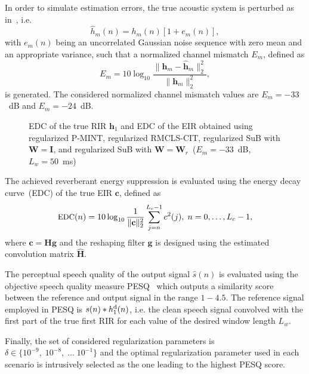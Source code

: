 \documentclass{article}
\begin{document}
In order to simulate estimation errors, the true acoustic system is perturbed as in~\cite{Cho_ITSA_1999}, i.e.
\begin{equation}
\hat{h}_m(n) = h_m(n)[1 + e_m(n)],
\end{equation}
with $e_m(n)$ being an uncorrelated Gaussian noise sequence with zero mean and an appropriate variance, such that a normalized channel mismatch $E_m$, defined as
\begin{equation}
  E_m = 10 \log_{10} \frac{\|\mathbf{h}_m-\hat{\mathbf{h}}_m\|_2^2}{\|\mathbf{h}_m\|_2^2},
\end{equation}
is generated.
The considered normalized channel mismatch values are $E_m = -33$~dB and $E_m = -24$~dB.
\begin{figure}[b!]
  
\caption{EDC of the true RIR $\mathbf{h}_1$ and EDC of the EIR obtained using regularized P-MINT, regularized RMCLS-CIT, regularized SuB with $\mathbf{W} = \mathbf{I}$, and regularized SuB with $\mathbf{W} = \mathbf{W}_{r}$~($E_m = -33$~dB, $L_w = 50$~ms)}
\label{fig: edc33}
\end{figure}

The achieved reverberant energy suppression is evaluated using the energy decay curve~(EDC) of the true EIR $\mathbf{c}$, defined as
\vspace{-0.45cm}
\begin{equation}
\small
 \hbox{EDC}(n) = 10 \log_{10}\frac{1}{\|\mathbf{c}\|_2^2}\sum_{j=n}^{L_c-1}c^2(j), \; n = 0,  \ldots,  L_c-1,
\end{equation}
where $\mathbf{c} = \mathbf{H}\mathbf{g}$ and the reshaping filter $\mathbf{g}$ is designed using the estimated convolution matrix $\hat{\mathbf{H}}$.

The perceptual speech quality of the output signal $\hat{s}(n)$ is evaluated using the objective speech quality measure PESQ~\cite{PESQ} which outputs a similarity score between the reference and output signal in the range $1-4.5$.
The reference signal employed in PESQ is $s(n) \ast h_1^{\rm d}(n)$, i.e. the clean speech signal convolved with the first part of the true first RIR for each value of the desired window length $L_w$.

Finally, the set of considered regularization parameters is $\delta \in \{10^{-9}, \; 10^{-8}, \; \ldots \;  10^{-1}\}$ and the optimal regularization parameter used in each scenario is intrusively selected as the one leading to the highest PESQ score.
\end{document}
